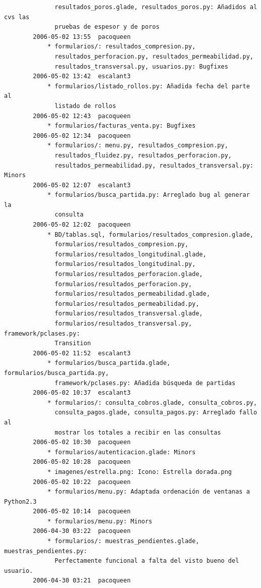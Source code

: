 \documentclass[a4paper]{article}
\begin{document}
\begin{verbatim}
              resultados_poros.glade, resultados_poros.py: Añadidos al cvs las
              pruebas de espesor y de poros
        2006-05-02 13:55  pacoqueen
            * formularios/: resultados_compresion.py,
              resultados_perforacion.py, resultados_permeabilidad.py,
              resultados_transversal.py, usuarios.py: Bugfixes
        2006-05-02 13:42  escalant3
            * formularios/listado_rollos.py: Añadida fecha del parte al
              listado de rollos
        2006-05-02 12:43  pacoqueen
            * formularios/facturas_venta.py: Bugfixes
        2006-05-02 12:34  pacoqueen
            * formularios/: menu.py, resultados_compresion.py,
              resultados_fluidez.py, resultados_perforacion.py,
              resultados_permeabilidad.py, resultados_transversal.py: Minors
        2006-05-02 12:07  escalant3
            * formularios/busca_partida.py: Arreglado bug al generar la
              consulta
        2006-05-02 12:02  pacoqueen
            * BD/tablas.sql, formularios/resultados_compresion.glade,
              formularios/resultados_compresion.py,
              formularios/resultados_longitudinal.glade,
              formularios/resultados_longitudinal.py,
              formularios/resultados_perforacion.glade,
              formularios/resultados_perforacion.py,
              formularios/resultados_permeabilidad.glade,
              formularios/resultados_permeabilidad.py,
              formularios/resultados_transversal.glade,
              formularios/resultados_transversal.py, framework/pclases.py:
              Transition
        2006-05-02 11:52  escalant3
            * formularios/busca_partida.glade, formularios/busca_partida.py,
              framework/pclases.py: Añadida búsqueda de partidas
        2006-05-02 10:37  escalant3
            * formularios/: consulta_cobros.glade, consulta_cobros.py,
              consulta_pagos.glade, consulta_pagos.py: Arreglado fallo al
              mostrar los totales a recibir en las consultas
        2006-05-02 10:30  pacoqueen
            * formularios/autenticacion.glade: Minors
        2006-05-02 10:28  pacoqueen
            * imagenes/estrella.png: Icono: Estrella dorada.png
        2006-05-02 10:22  pacoqueen
            * formularios/menu.py: Adaptada ordenación de ventanas a Python2.3
        2006-05-02 10:14  pacoqueen
            * formularios/menu.py: Minors
        2006-04-30 03:22  pacoqueen
            * formularios/: muestras_pendientes.glade, muestras_pendientes.py:
              Perfectamente funcional a falta del visto bueno del usuario.
        2006-04-30 03:21  pacoqueen

\end{verbatim}
\end{document}
